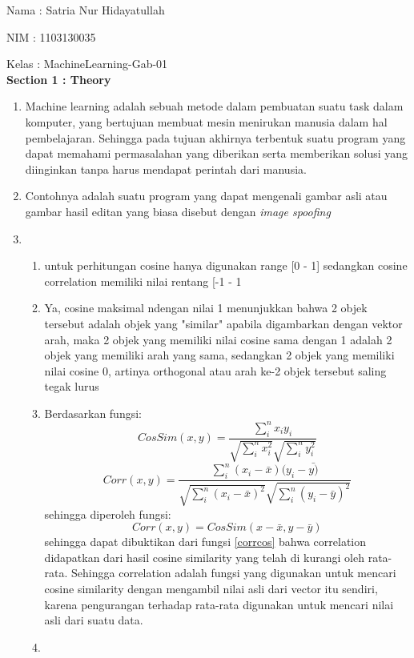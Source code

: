 \documentclass{article}
\begin{document}
Nama : Satria Nur Hidayatullah

NIM : 1103130035

Kelas : MachineLearning-Gab-01\\



\textbf{Section 1 : Theory}
\begin{enumerate}
	\item Machine learning adalah sebuah metode dalam pembuatan suatu task dalam komputer, yang bertujuan membuat
	mesin menirukan manusia dalam hal pembelajaran. Sehingga pada tujuan akhirnya terbentuk suatu program yang dapat
	memahami permasalahan yang diberikan serta memberikan solusi yang diinginkan tanpa harus mendapat perintah dari manusia.
	\item Contohnya adalah suatu program yang dapat mengenali gambar asli atau gambar hasil editan yang biasa disebut dengan \textit{image spoofing}
	\item
	\begin{enumerate}
		\item untuk perhitungan cosine hanya digunakan range [0 - 1] sedangkan cosine correlation memiliki nilai rentang [-1 - 1\
		\item Ya, cosine maksimal ndengan nilai 1 menunjukkan bahwa 2 objek tersebut adalah objek yang "similar" apabila digambarkan dengan
		vektor arah, maka 2 objek yang memiliki nilai cosine sama dengan 1 adalah 2 objek yang memiliki arah yang sama, sedangkan 2 objek
		yang memiliki nilai cosine 0, artinya orthogonal atau arah ke-2 objek tersebut saling tegak lurus
		\item Berdasarkan fungsi:\\
		\begin{equation}\label{cossim}
			CosSim(x,y) = \dfrac{\sum_{i}^{n}x_{i}y_{i}}{\sqrt{\sum_{i}^{n}x_{i}^{2}}\sqrt{\sum_{i}^{n}y_{i}^{2}}}
		\end{equation}
		\begin{equation}\label{corr}
			Corr(x,y) = \dfrac{\sum_{i}^{n}(x_{i} - \bar{x})(y_{i} - \bar{y)}}{\sqrt{\sum_{i}^{n}(x_{i} - \bar{x})^{2}}\sqrt{\sum_{i}^{n}(y_{i} - \bar{y})^{2}}}
		\end{equation}
		sehingga diperoleh fungsi:\\
		\begin{equation}\label{corrcos}
			Corr(x,y) = CosSim(x - \bar{x}, y - \bar{y})
		\end{equation}
		sehingga dapat dibuktikan dari fungsi \eqref{corrcos} bahwa correlation didapatkan dari hasil cosine similarity yang telah di kurangi oleh rata-rata. Sehingga correlation adalah fungsi yang digunakan untuk mencari cosine similarity dengan mengambil nilai asli dari vector itu sendiri, karena pengurangan terhadap rata-rata digunakan untuk mencari nilai asli dari suatu data.
		\item 
	\end{enumerate}
\end{enumerate}
\end{document}
